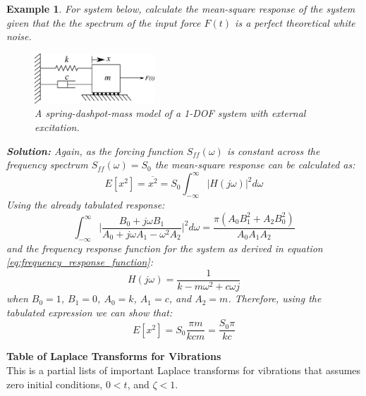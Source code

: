 \documentclass[12pt,letter]{article}
\newtheorem{ex}{Example}
\numberwithin{ex}{section} %
\newenvironment{example}{\begin{mdframed}[middlelinewidth=0.5mm]\begin{ex}\normalfont}{\end{ex}\end{mdframed}}
\numberwithin{re}{section} %
\begin{document}
\begin{example}
	For system below, calculate the mean-square response of the system given that the the spectrum of the input force $F(t)$ is a perfect theoretical white noise.
	\begin{figure}[H]
		\centering
		\includegraphics[width=0.4\textwidth]{../Figures/forced_spring_mass_damper_system.png}
		\caption{A spring-dashpot-mass model of a 1-DOF system with external excitation.}
	\end{figure}
	\noindent\textbf{Solution:} Again, as the forcing function $S_{ff}(\omega)$ is constant across the frequency spectrum $S_{ff}(\omega)=S_0$ the mean-square response can be calculated as:
	\begin{equation}
		E[x^2] = \overline{x^2} =   S_{0} \int_{-\infty}^{\infty} |H(j\omega)|^2 d\omega
	\end{equation}
	Using the already tabulated response:
	\begin{equation}
		\int_{-\infty}^{\infty} \bigg|\frac{B_0 + j \omega B_1}{A_0+j \omega A_1 - \omega^2 A_2} \bigg|^2 d\omega = \frac{\pi (A_0 B_1^2 + A_2 B_0^2)}{A_0 A_1 A_2}
	\end{equation} 
	and the frequency response function for the system as derived in equation \ref{eq:frequency_response_function}:
	\begin{equation}
		H(j\omega) = \frac{1}{k-m\omega^2+c\omega j}
	\end{equation}
	when $B_0=1$, $B_1 = 0$, $A_0=k$, $A_1=c$, and $A_2 =m$. Therefore, using the tabulated expression we can show that:
	\begin{equation}
		E[x^2] = S_0 \frac{\pi m }{k c m} =  \frac{S_0 \pi}{k c}
	\end{equation} 
\end{example}			
			
\pagebreak			
			\pagestyle{empty}
			\vspace{-25ex}
			\begin{center}
			{\large{}\textbf{Table of Laplace Transforms for Vibrations}} \\
			\normalsize{} This is a partial lists of important Laplace transforms for vibrations that assumes \\ zero initial conditions, $0 < t$, and $\zeta < 1$.
			\end{center}
			
\end{document}
